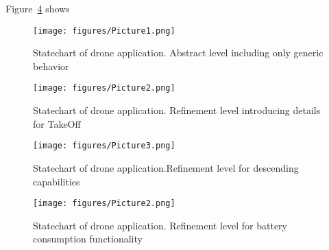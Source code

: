 Figure~\ref{fig:drone4} shows

\begin{figure}[!h]
	\vspace{-.4cm}
	\centering
	\texttt{[image: figures/Picture1.png]}
	\caption{Statechart of drone application. Abstract level including only generic behavior }
	\label{fig:drone1}
	\vspace{-.4cm}
\end{figure} 

\begin{figure}[!h]
	\centering
	\texttt{[image: figures/Picture2.png]}
	\caption{Statechart of drone application. Refinement level introducing details for TakeOff}
	\label{fig:drone2}
\end{figure} 

\begin{figure}[!h]
	\centering
	\texttt{[image: figures/Picture3.png]}
	\caption{Statechart of drone application.Refinement level for descending capabilities}
	\label{fig:drone3}
\end{figure} 

\begin{figure}[!h]
	\centering
	\texttt{[image: figures/Picture2.png]}
	\caption{Statechart of drone application. Refinement level for battery consumption functionality}
	\label{fig:drone4}
\end{figure} 

